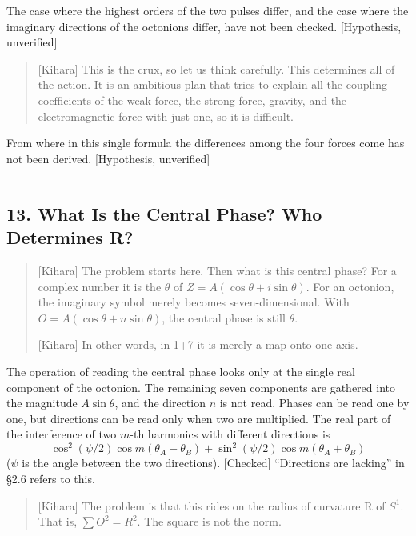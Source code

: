 \documentclass[
  a4paper,
]{article}
\begin{document}
The case where the highest orders of the two pulses differ, and the case
where the imaginary directions of the octonions differ, have not been
checked. {[}Hypothesis, unverified{]}

\begin{quote}
{[}Kihara{]} This is the crux, so let us think carefully. This
determines all of the action. It is an ambitious plan that tries to
explain all the coupling coefficients of the weak force, the strong
force, gravity, and the electromagnetic force with just one, so it is
difficult.
\end{quote}

From where in this single formula the differences among the four forces
come has not been derived. {[}Hypothesis, unverified{]}

\begin{center}\rule{0.5\linewidth}{0.5pt}\end{center}

\subsection{13. What Is the Central Phase? Who Determines
R?}\label{what-is-the-central-phase-who-determines-r}

\begin{quote}
{[}Kihara{]} The problem starts here. Then what is this central phase?
For a complex number it is the \(\theta\) of
\(Z = A(\cos\theta + i\sin\theta)\). For an octonion, the imaginary
symbol merely becomes seven-dimensional. With
\(O = A(\cos\theta + n\sin\theta)\), the central phase is still
\(\theta\).

{[}Kihara{]} In other words, in 1+7 it is merely a map onto one axis.
\end{quote}

The operation of reading the central phase looks only at the single real
component of the octonion. The remaining seven components are gathered
into the magnitude \(A\sin\theta\), and the direction \(n\) is not read.
Phases can be read one by one, but directions can be read only when two
are multiplied. The real part of the interference of two \(m\)-th
harmonics with different directions is \[
\cos^2(\psi/2)\cos m(\theta_A - \theta_B) + \sin^2(\psi/2)\cos m(\theta_A + \theta_B) \tag{13.1}
\] (\(\psi\) is the angle between the two directions). {[}Checked{]}
``Directions are lacking'' in §2.6 refers to this.

\begin{quote}
{[}Kihara{]} The problem is that this rides on the radius of curvature R
of \(S^1\). That is, \(\sum O^2 = R^2\). The square is not the norm.
\end{quote}
\end{document}

